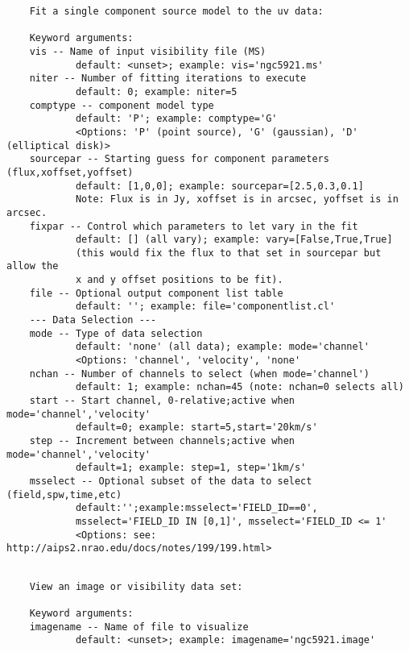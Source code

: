 \vspace{3mm}
\small
\begin{verbatim}
    Fit a single component source model to the uv data:
    
    Keyword arguments:
    vis -- Name of input visibility file (MS)
            default: <unset>; example: vis='ngc5921.ms'
    niter -- Number of fitting iterations to execute
            default: 0; example: niter=5
    comptype -- component model type
            default: 'P'; example: comptype='G'
            <Options: 'P' (point source), 'G' (gaussian), 'D' (elliptical disk)>
    sourcepar -- Starting guess for component parameters (flux,xoffset,yoffset)
            default: [1,0,0]; example: sourcepar=[2.5,0.3,0.1]
            Note: Flux is in Jy, xoffset is in arcsec, yoffset is in arcsec.
    fixpar -- Control which parameters to let vary in the fit
            default: [] (all vary); example: vary=[False,True,True]
            (this would fix the flux to that set in sourcepar but allow the
            x and y offset positions to be fit).
    file -- Optional output component list table
            default: ''; example: file='componentlist.cl'
    --- Data Selection ---
    mode -- Type of data selection
            default: 'none' (all data); example: mode='channel'
            <Options: 'channel', 'velocity', 'none'
    nchan -- Number of channels to select (when mode='channel')
            default: 1; example: nchan=45 (note: nchan=0 selects all)
    start -- Start channel, 0-relative;active when mode='channel','velocity'
            default=0; example: start=5,start='20km/s'
    step -- Increment between channels;active when mode='channel','velocity'
            default=1; example: step=1, step='1km/s'
    msselect -- Optional subset of the data to select (field,spw,time,etc)
            default:'';example:msselect='FIELD_ID==0', 
            msselect='FIELD_ID IN [0,1]', msselect='FIELD_ID <= 1'
            <Options: see: http://aips2.nrao.edu/docs/notes/199/199.html>
\end{verbatim}
\normalsize


\vspace{3mm}
\small
\begin{verbatim}

    View an image or visibility data set:
    
    Keyword arguments:
    imagename -- Name of file to visualize
            default: <unset>; example: imagename='ngc5921.image'
\end{verbatim}
\normalsize



